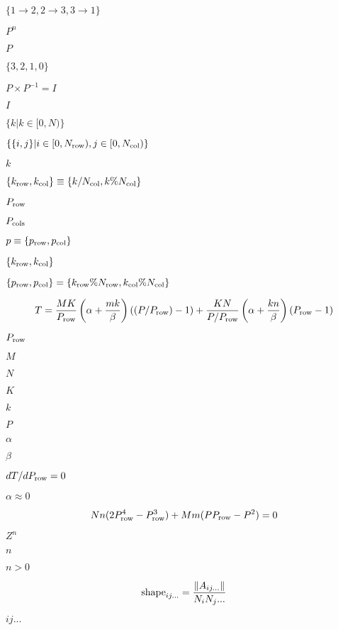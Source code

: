 \documentclass{article}
\begin{document}
$ \{ 1 \to 2, 2 \to 3, 3 \to 1 \} $
\pagebreak

$ P^n $
\pagebreak

$ P $
\pagebreak

$ \{3, 2, 1, 0 \} $
\pagebreak

$ P \times P^{-1} = I $
\pagebreak

$ I $
\pagebreak

$ \{ k | k \in [0,N) \} $
\pagebreak

$ \{ \{i,j\} | i \in [0,N_{\rm row}),j\in[0,N_{\rm col})\} $
\pagebreak

$ k $
\pagebreak

$ \{ k_{\rm row}, k_{\rm col} \} \equiv \{ k / N_{\rm col}, k \% N_{\rm col} \} $
\pagebreak

$ P_{\rm row} $
\pagebreak

$ P_{\rm cols} $
\pagebreak

$ p \equiv \{ p_{\rm row}, p_{\rm col} \} $
\pagebreak

$ \{ k_{\rm row}, k_{\rm col} \} $
\pagebreak

$ \{ p_{\rm row}, p_{\rm col} \} = \{ k_{\rm row} \% N_{\rm row}, k_{\rm col} \% N_{\rm col} \} $
\pagebreak

\[ T = \frac{MK}{P_{\rm{row}}} \left(\alpha + \frac{mk}{\beta}\right) \left((P/P_{\rm{row}}) - 1\right) + \frac{KN}{P/P_{\rm{row}}} \left(\alpha + \frac{kn}{\beta}\right) \left(P_{\rm{row}} - 1\right) \]
\pagebreak

$P_{\rm{row}}$
\pagebreak

$M$
\pagebreak

$N$
\pagebreak

$K$
\pagebreak

$k$
\pagebreak

$P$
\pagebreak

$\alpha$
\pagebreak

$\beta$
\pagebreak

$dT/dP_{\rm{row}} = 0$
\pagebreak

$\alpha \approx 0$
\pagebreak

\[ Nn(2 P_{\rm{row}}^4 - P_{\rm{row}}^3) + Mm(P P_{\rm{row}} - P^2) = 0 \]
\pagebreak

$ Z^n $
\pagebreak

$ n $
\pagebreak

$ n>0 $
\pagebreak

\[ {\rm{shape}}_{ij...} = \frac{\|A_{ij...}\|}{N_i N_j ...} \]
\pagebreak

$ij...$
\pagebreak
\end{document}
